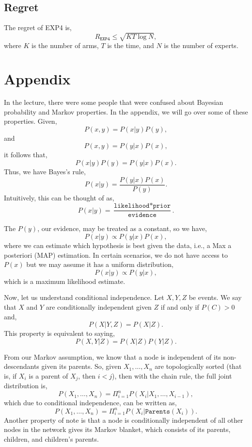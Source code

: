 \documentclass[11pt]{article}
\begin{document}
\subsection{Regret}
The regret of EXP4 is,
$$R_{\texttt{EXP4}} \leq \sqrt{KT\log N},$$
where $K$ is the number of arms, $T$ is the time, and $N$ is the number of experts.

\section*{Appendix}
In the lecture, there were some people that were confused about Bayesian probability and Markov properties. In the appendix, we will go over some of these properties.
Given,
$$ P(x,y) = P(x|y) P(y),$$
and 
$$ P(x,y) = P(y|x) P(x),$$
it follows that,
$$ P(x|y) P(y) = P(y|x)P(x).$$
Thus, we have Bayes's rule,
$$ P(x|y) = \frac{P(y|x) P(x)}{P(y)}. $$
Intuitively, this can be thought of as,
$$ P(x|y) = \frac{\texttt{likelihood} * \texttt{prior}}{\texttt{evidence}}.$$

The $P(y)$, our evidence, may be treated as a constant, so we have,
$$ P(x|y) \propto P(y|x)P(x),$$
where we can estimate which hypothesis is best given the data, i.e., a Max a posteriori (MAP) estimation. In certain scenarios, we do not have access to $P(x)$ but we may assume it has a uniform distribution,
$$ P(x|y) \propto P(y|x), $$
which is a maximum likelihood estimate.

Now, let us understand conditional independence. 
Let $X,Y,Z$ be events. We say that $X$ and $Y$ are conditionally independent given $Z$ if and only if $P(C) > 0$ and,
$$ P(X|Y,Z) = P(X|Z). $$
This property is equivalent to saying,
$$ P(X,Y|Z) = P(X|Z)P(Y|Z). $$

From our Markov assumption, we know that a node is independent of its non-descendants given its parents. So, given $X_1,\ldots,X_n$ are topologically sorted (that is, if $X_i$ is a parent of $X_j$, then $i<j$), then with the chain rule, the full joint distribution is,
$$ P(X_1,\ldots,X_n) = \Pi_{i=1}^n P(X_i|X_1,\ldots,X_{i-1}), $$
which due to conditional independence, can be written as,
$$ P(X_1,\ldots,X_n) = \Pi_{i=1}^n P(X_i|\texttt{Parents}(X_i)). $$
Another property of note is that a node is conditionally independent of all other nodes in the network gives its Markov blanket, which consists of its parents, children, and children's parents.
\end{document}
